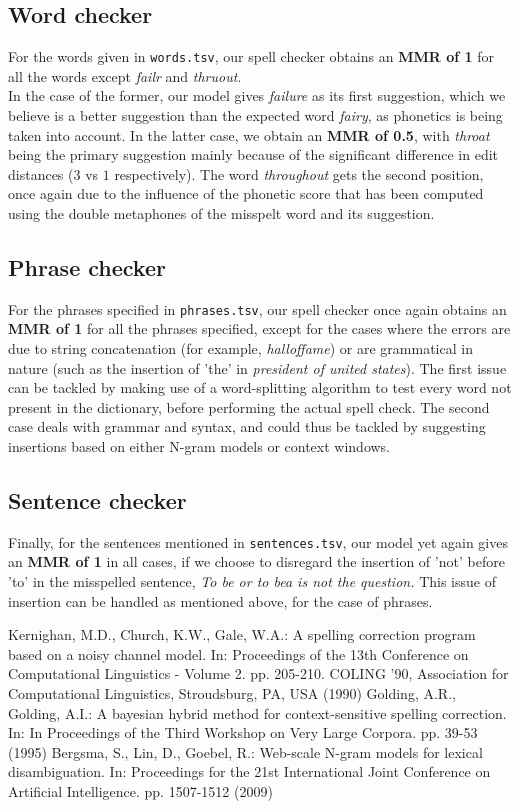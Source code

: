 \subsection{Word checker}
For the words given in \texttt{words.tsv}, our spell checker obtains an \textbf{MMR of 1} for all the words except \textit{failr} and \textit{thruout}.\\
In the case of the former, our model gives \textit{failure} as its first suggestion, which we believe is a better suggestion than the expected word \textit{fairy}, as phonetics is being taken into account. In the latter case, we obtain an \textbf{MMR of 0.5}, with \textit{throat} being the primary suggestion mainly because of the significant difference in edit distances ($3$ vs $1$ respectively). The word \textit{throughout} gets the second position, once again due to the influence of the phonetic score that has been computed using the double metaphones of the misspelt word and its suggestion.

\subsection{Phrase checker}
For the phrases specified in \texttt{phrases.tsv}, our spell checker once again obtains an \textbf{MMR of 1} for all the phrases specified, except for the cases where the errors are due to string concatenation (for example, \textit{halloffame}) or are grammatical in nature (such as the insertion of 'the' in \textit{president of united states}). The first issue can be tackled by making use of a word-splitting algorithm to test every word not present in the dictionary, before performing the actual spell check. The second case deals with grammar and syntax, and could thus be tackled by suggesting insertions based on either N-gram models or context windows.

\subsection{Sentence checker}
Finally, for the sentences mentioned in \texttt{sentences.tsv}, our model yet again gives an \textbf{MMR of 1} in all cases, if we choose to disregard the insertion of 'not' before 'to' in the misspelled sentence, \textit{To be or to bea is not the question.} This issue of insertion can be handled as mentioned above, for the case of phrases.

\begin{thebibliography}{9}
 Kernighan, M.D., Church, K.W., Gale, W.A.: A spelling correction program based on a noisy channel model. In: Proceedings of the 13th Conference on Computational Linguistics - Volume 2. pp. 205-210. COLING '90,
Association for Computational Linguistics, Stroudsburg, PA, USA (1990)
 Golding, A.R., Golding, A.I.: A bayesian hybrid method for context-sensitive
spelling correction. In: In Proceedings of the Third Workshop on Very Large
Corpora. pp. 39-53 (1995)
 Bergsma, S., Lin, D., Goebel, R.: Web-scale N-gram models for lexical disambiguation. In: Proceedings for the 21st International Joint Conference on Artificial Intelligence. pp. 1507-1512 (2009)
\end{thebibliography}


